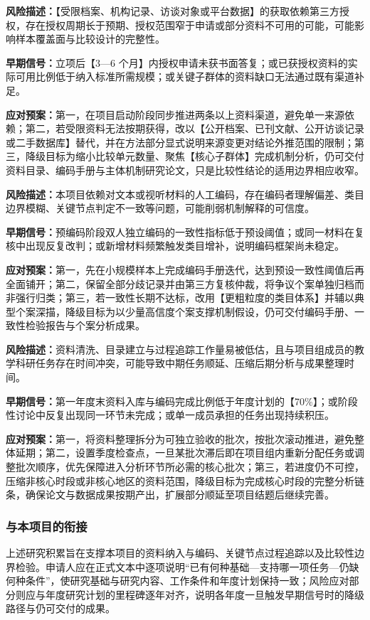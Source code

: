 \textbf{风险描述：}【受限档案、机构记录、访谈对象或平台数据】的获取依赖第三方授权，存在授权周期长于预期、授权范围窄于申请或部分资料不可用的可能，可能影响样本覆盖面与比较设计的完整性。

\textbf{早期信号：}立项后【3---6 个月】内授权申请未获书面答复；或已获授权资料的实际可用比例低于纳入标准所需规模；或关键子群体的资料缺口无法通过既有渠道补足。

\textbf{应对预案：}第一，在项目启动阶段同步推进两条以上资料渠道，避免单一来源依赖；第二，若受限资料无法按期获得，改以【公开档案、已刊文献、公开访谈记录或二手数据库】替代，并在方法部分显式说明来源变更对结论外推范围的限制；第三，降级目标为缩小比较单元数量、聚焦【核心子群体】完成机制分析，仍可交付资料目录、编码手册与主体机制研究论文，只是比较性结论的适用边界相应收窄。

\textbf{风险描述：}本项目依赖对文本或视听材料的人工编码，存在编码者理解偏差、类目边界模糊、关键节点判定不一致等问题，可能削弱机制解释的可信度。

\textbf{早期信号：}预编码阶段双人独立编码的一致性指标低于预设阈值；或同一材料在复核中出现反复改判；或新增材料频繁触发类目增补，说明编码框架尚未稳定。

\textbf{应对预案：}第一，先在小规模样本上完成编码手册迭代，达到预设一致性阈值后再全面铺开；第二，保留全部分歧记录并由第三方复核仲裁，将争议个案单独归档而非强行归类；第三，若一致性长期不达标，改用【更粗粒度的类目体系】并辅以典型个案深描，降级目标为以少量高信度个案支撑机制假设，仍可交付编码手册、一致性检验报告与个案分析成果。

\textbf{风险描述：}资料清洗、目录建立与过程追踪工作量易被低估，且与项目组成员的教学科研任务存在时间冲突，可能导致中期任务顺延、压缩后期分析与成果整理时间。

\textbf{早期信号：}第一年度末资料入库与编码完成比例低于年度计划的【70\%】；或阶段性讨论中反复出现同一环节未完成；或单一成员承担的任务出现持续积压。

\textbf{应对预案：}第一，将资料整理拆分为可独立验收的批次，按批次滚动推进，避免整体延期；第二，设置季度检查点，一旦某批次滞后即在项目组内重新分配任务或调整批次顺序，优先保障进入分析环节所必需的核心批次；第三，若进度仍不可控，压缩非核心时段或非核心地区的资料范围，降级目标为完成核心时段的完整分析链条，确保论文与数据成果按期产出，扩展部分顺延至项目结题后继续完善。

\subsubsection{与本项目的衔接}
上述研究积累旨在支撑本项目的资料纳入与编码、关键节点过程追踪以及比较性边界检验。申请人应在正式文本中逐项说明“已有何种基础---支持哪一项任务---仍缺何种条件”，使研究基础与研究内容、工作条件和年度计划保持一致；风险应对部分则应与年度研究计划的里程碑逐年对齐，说明各年度一旦触发早期信号时的降级路径与仍可交付的成果。

